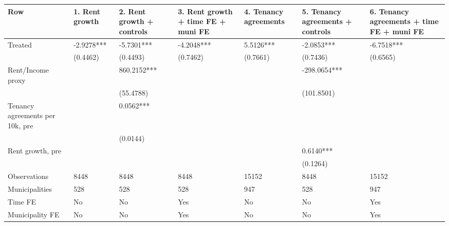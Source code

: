 \begin{tabular}{lllllll}
\toprule
Row & 1. Rent growth & 2. Rent growth + controls & 3. Rent growth + time FE + muni FE & 4. Tenancy agreements & 5. Tenancy agreements + controls & 6. Tenancy agreements + time FE + muni FE \\
\midrule
Treated & -2.9278*** & -5.7301*** & -4.2048*** & 5.5126*** & -2.0853*** & -6.7518*** \\
 & (0.4462) & (0.4493) & (0.7462) & (0.7661) & (0.7436) & (0.6565) \\
Rent/Income proxy &  & 860.2152*** &  &  & -298.0654*** &  \\
 &  & (55.4788) &  &  & (101.8501) &  \\
Tenancy agreements per 10k, pre &  & 0.0562*** &  &  &  &  \\
 &  & (0.0144) &  &  &  &  \\
Rent growth, pre &  &  &  &  & 0.6140*** &  \\
 &  &  &  &  & (0.1264) &  \\
Observations & 8448 & 8448 & 8448 & 15152 & 8448 & 15152 \\
Municipalities & 528 & 528 & 528 & 947 & 528 & 947 \\
Time FE & No & No & Yes & No & No & Yes \\
Municipality FE & No & No & Yes & No & No & Yes \\
\bottomrule
\end{tabular}
